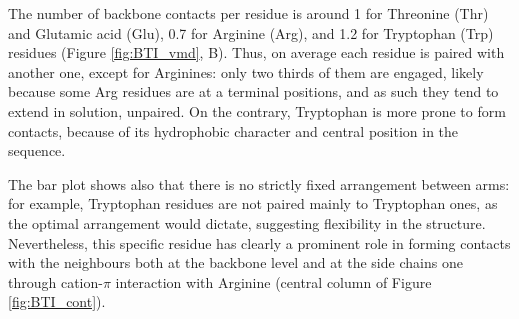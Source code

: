 The number of backbone contacts per residue is around 1 for Threonine (Thr) and Glutamic acid (Glu), 0.7 for Arginine (Arg), and 1.2 for Tryptophan (Trp) residues (Figure \ref{fig:BTI_vmd}, B).
%
Thus, on average each residue is paired with another one, except for Arginines: only two thirds of them are engaged, likely because some Arg residues are at a terminal positions, and as such they tend to extend in solution, unpaired. On the contrary, Tryptophan is more prone to form contacts, because of its hydrophobic character and central position in the sequence.

The bar plot shows also that there is no strictly fixed arrangement between arms: for example, Tryptophan residues are not paired mainly to Tryptophan ones, as the optimal arrangement would dictate, suggesting flexibility in the structure.
%
Nevertheless, this specific residue has clearly a prominent role in forming contacts with the neighbours both at the backbone level and at the side chains one through cation-$\pi$ interaction with Arginine (central column of Figure \ref{fig:BTI_cont}).

